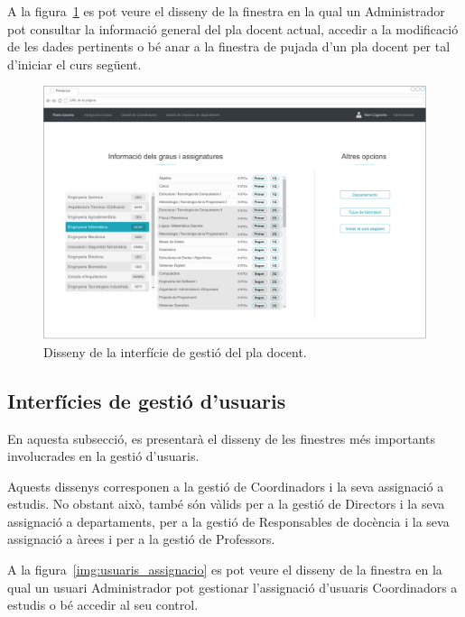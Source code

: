 \documentclass[a4paper,12pt]{ThesisStyle}
\begin{document}
A la figura~\ref{img:plaDocent_general} es pot veure el disseny de la finestra en la qual un Administrador pot consultar la informació general del pla docent actual, accedir a la modificació de les dades pertinents o bé anar a la finestra de pujada d'un pla docent per tal d'iniciar el curs següent.

\begin{figure}[H]
	\centering
	\includegraphics[width=\textwidth]{assets/interfaces/plaDocent/general.pdf}
	\caption{\label{img:plaDocent_general}Disseny de la interfície de gestió del pla docent.}
\end{figure}

\subsection{Interfícies de gestió d'usuaris}
\label{subsec:interficies_gestio_usuaris}

En aquesta subsecció, es presentarà el disseny de les finestres més importants involucrades en la gestió d'usuaris.

Aquests dissenys corresponen a la gestió de Coordinadors i la seva assignació a estudis. No obstant això, també són vàlids per a la gestió de Directors i la seva assignació a departaments, per a la gestió de Responsables de docència i la seva assignació a àrees i per a la gestió de Professors.

A la figura~\ref{img:usuaris_assignacio} es pot veure el disseny de la finestra en la qual un usuari Administrador pot gestionar l'assignació d'usuaris Coordinadors a estudis o bé accedir al seu control.
\end{document}
